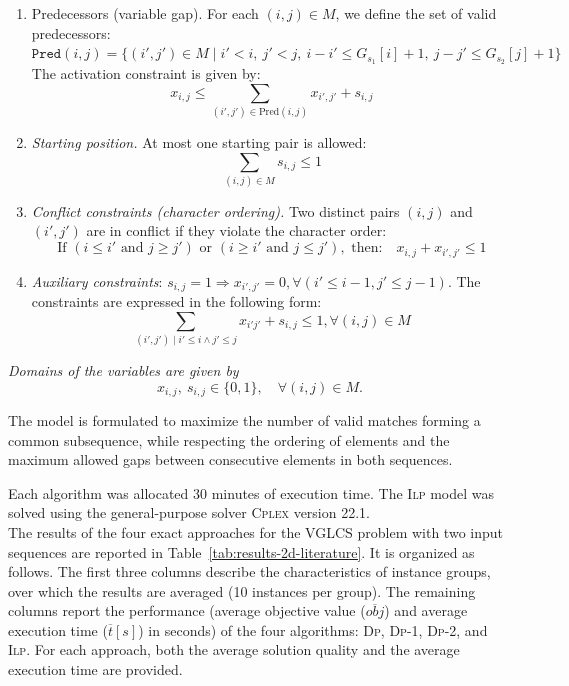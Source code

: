 \documentclass[runningheads]{llncs}
\begin{document}
\begin{enumerate}
	\item \textrm{Predecessors (variable gap).}  
	For each $(i,j) \in M$, we define the set of valid predecessors: $
	\texttt{Pred}(i,j) =
	\{ (i',j') \in M \mid i' < i,\ j' < j,\ i - i' \leq G_{s_1}[i] + 1,\ j - j' \leq G_{s_2}[j] + 1 \}$
	The activation constraint is given by:
	\[
	x_{i,j} \leq \sum_{(i',j') \in \textrm{Pred}(i,j)} x_{i',j'} + s_{i,j}
	\]
	
	\item \textit{Starting position.}  
	At most one starting pair is allowed:
	\[
	\sum_{(i,j) \in M} s_{i,j} \leq 1
	\]
	
	\item \textit{Conflict constraints (character ordering).}  
	Two distinct pairs $(i,j)$ and $(i',j')$ are in conflict if they violate the character order:
	\[
	\textrm{If } (i \leq i' \textrm{ and } j \geq j') \textrm{ or }
	(i \geq i' \textrm{ and } j \leq j'), \textrm{ then:}
	\quad x_{i,j} + x_{i',j'} \leq 1
	\]
	\item \textit{Auxiliary constraints}: $s_{i, j}=1 \Rightarrow x_{i',j'}=0, \forall (i' \leq i-1, j' \leq j-1)$. The constraints are expressed in the following form: 
	$$ \sum_{(i', j') \mid i'\leq i \wedge j'\leq j} x_{i' j'} + s_{i, j} \leq 1, \forall (i, j) \in M$$
\end{enumerate}


\textit{Domains of the variables are given by}
\[
x_{i,j},\ s_{i,j} \in \{0,1\}, \quad \forall (i,j) \in M.
\]

The model is formulated to maximize the number of valid matches forming a common subsequence,
while respecting the ordering of elements and the maximum allowed gaps between consecutive elements in both sequences.


Each algorithm was allocated 30 minutes of execution time. The \textsc{Ilp} model was solved using the general-purpose solver \textsc{Cplex} version 22.1. \\

The results of the four exact approaches for the VGLCS problem with two input sequences are reported in Table~\ref{tab:results-2d-literature}. It is organized as follows.  The first three columns describe the characteristics of instance groups, over which the results are averaged (10 instances per group). The remaining columns report the performance (average objective value ($\overline{obj}$) and average execution time ($\overline{t}[s]$) in seconds) of the four algorithms: \textsc{Dp}, \textsc{Dp}-1, \textsc{Dp}-2, and \textsc{Ilp}. For each approach, both the average solution quality and the average execution time are provided.  %
\end{document}
